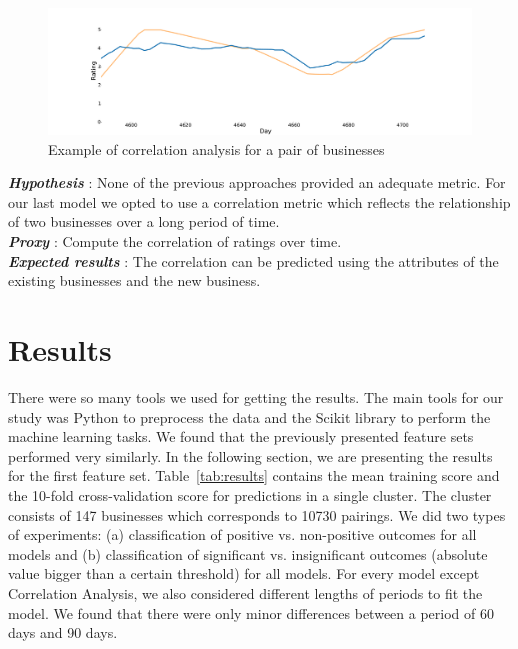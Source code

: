\documentclass{vldb}
\begin{document}
\begin{figure}[h]
\centering
\includegraphics[width=\columnwidth]{corr.pdf}
\caption{Example of correlation analysis for a pair of businesses}
\end{figure}

\textbf{\textit{Hypothesis}} : None of the previous approaches provided an adequate metric.
For our last model we opted to use a correlation metric which reflects the relationship of two businesses over a long period of time.\\
\textbf{\textit{Proxy}} : Compute the correlation of ratings over time.\\
\textbf{\textit{Expected results}} : The correlation can be predicted using the attributes of the existing businesses and the new business. 


\section{Results}
%
There were so many tools we used for getting the results. The main tools for our study was Python to preprocess the data and the Scikit \cite{pedregosa2011scikit} library to perform the machine learning tasks.
We found that the previously presented feature sets performed very similarly. In the following section, we are presenting the results for the first feature set.
Table~\ref{tab:results} contains the mean training score and the 10-fold cross-validation score for predictions in a single cluster.
The cluster consists of 147 businesses which corresponds to 10730 pairings.
We did two types of experiments: (a) classification of positive vs. non-positive outcomes for all models and (b) classification of significant vs. insignificant outcomes (absolute value bigger than a certain threshold) for all models.
For every model except Correlation Analysis, we also considered different lengths of periods to fit the model.
We found that there were only minor differences between a period of 60 days and 90 days.
\end{document}
